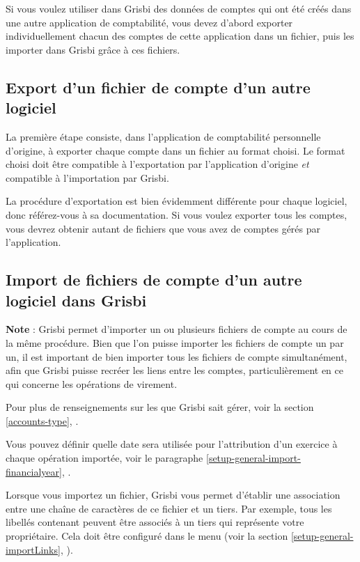 Si vous voulez utiliser dans Grisbi des données de comptes qui ont été créés
dans une autre application de comptabilité, vous devez d'abord exporter individuellement chacun des comptes de cette application dans un fichier, puis les importer dans Grisbi grâce à ces fichiers.


\subsection{Export d'un fichier de compte d'un autre logiciel\label{move-import-exportinit}}

La première étape consiste, dans l'application de comptabilité personnelle
d'origine, à exporter chaque compte dans un fichier au format choisi. Le format choisi doit être compatible à l'exportation par l'application d'origine \emph{et} compatible à l'importation par Grisbi.

La procédure d'exportation est bien évidemment différente pour chaque logiciel, donc référez-vous à sa documentation. Si vous voulez exporter tous les comptes, vous devrez obtenir autant de fichiers que vous avez de comptes gérés par l'application.


\subsection{Import de fichiers de compte d'un autre logiciel dans Grisbi\label{move-import-importinit}}

\textbf{Note} : Grisbi permet d'importer un ou plusieurs fichiers de compte au cours de la même procédure. Bien que l'on puisse importer les fichiers de compte un par un, il est important de bien importer tous les fichiers de compte simultanément, afin que Grisbi puisse recréer les liens entre les comptes, particulièrement en ce qui concerne les opérations de virement.

Pour plus de renseignements sur les  que Grisbi sait gérer,  voir la section \vref{accounts-type}, .

Vous pouvez définir quelle date sera utilisée pour l'attribution d'un exercice à 
chaque opération importée, voir le paragraphe \vref{setup-general-import-financialyear}, .

Lorsque vous importez un fichier, Grisbi vous permet d'établir une association entre une chaîne de caractères de ce fichier et un tiers. Par exemple, tous les libellés contenant  peuvent être associés à un tiers qui représente votre propriétaire. Cela doit être configuré dans le menu  (voir la section \vref{setup-general-importLinks}, ).

